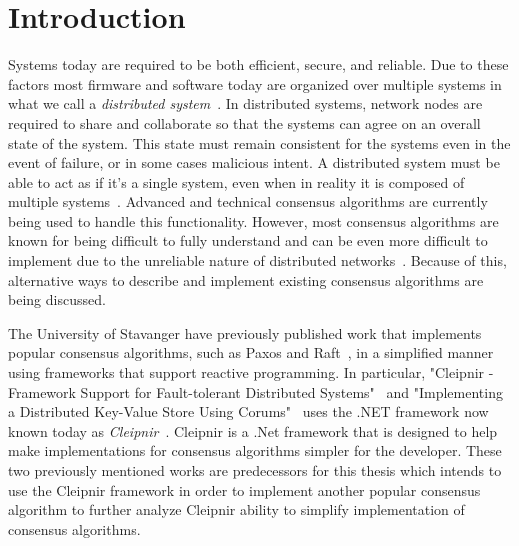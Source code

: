 \chapter{Introduction}
\iffalse
Systems today are required to be both efficient, secure, and reliable. Due to these factors most firmware and software today are organized over multiple systems in what we call a \textit{distributed system}~\cites{WEB:DistSys}[p.~16]{BOOK:MVstandver3}. In distributed systems, network nodes are required to share and collaborate so that the systems can agree on an overall state of the system. This state must remain consistent for the systems even in the event of failure, or in some cases malicious intent. A distributed system must be able to act as if it's a single system, even when in reality it is composed of multiple systems~\cite[p.~18]{BOOK:MVstandver3}. Advanced and technical consensus algorithms are currently being used to handle this functionality.
However, most consensus algorithms are known for being difficult to fully understand and can be even more difficult to implement due to the unreliable nature of distributed networks~\cites[p.~459]{BOOK:MVstandver3}[p.~13]{PAPER:EivindPaper}. Because of this, alternative ways to describe and implement existing consensus algorithms are being discussed.

The University of Stavanger have previously published work that implements popular consensus algorithms, such as Paxos and Raft~\cite{WEB:ConsesAlgo}, in a simplified manner using frameworks that support reactive programming. In particular, "Cleipnir - Framework Support for Fault-tolerant Distributed Systems"~\cite{PAPER:PaxosCleipnir} and "Implementing a Distributed Key-Value Store Using Corums"~\cite{PAPER:EivindPaper} uses the .NET framework now known today as \textit{Cleipnir}~\cite{DOC:Cleipnir}.
Cleipnir is a .Net framework that is designed to help make implementations for consensus algorithms simpler for the developer.
These two previously mentioned works are predecessors for this thesis which intends to use the Cleipnir framework in order to implement another popular consensus algorithm to further analyze Cleipnir ability to simplify implementation of consensus algorithms.

